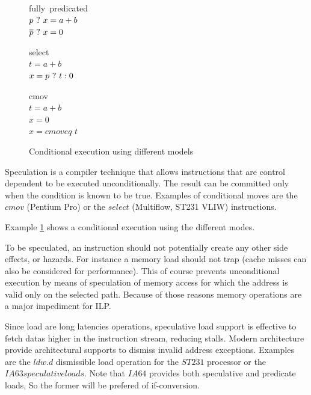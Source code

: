 \begin{figure}
\footnotesize
\begin{minipage}[t]{3cm}
\mbox{fully predicated} \\
$p ~?~ x = a + b $ \\
$\overline{p} ~?~ x = 0 $ \\
\end{minipage} 
\begin{minipage}[t]{3cm}
\mbox{select} \\
$t = a + b $ \\
$x= p ~?~ t : 0 $ \\
\end{minipage}
\begin{minipage}[t]{3cm}
\mbox{cmov} \\
$t = a + b $ \\
$x = 0 $ \\
$x = cmoveq$ $t$ \\
\end{minipage}
\caption{Conditional execution using different models}
\label{fig:pred}
\end{figure}

Speculation is a compiler technique that allows instructions that are control dependent to be executed unconditionally. The result can be committed only when the condition is known to be true. Examples of conditional moves are the $cmov$ (Pentium Pro) or the $select$ (Multiflow, ST231 VLIW) instructions.

Example \ref{fig:pred} shows a conditional execution using the different modes.

To be speculated, an instruction should not potentially create any other side effects, or hazards. For instance a memory load should not trap (cache misses can also be considered for performance). This of course prevents unconditional execution by means of speculation of memory access for which the address is valid only on the selected path. Because of those reasons memory operations are a major impediment for ILP. 

Since load are long latencies operations, speculative load support is effective to fetch datas higher in the instruction stream, reducing stalls. Modern architecture provide architectural supports to dismiss invalid address exceptions. Examples are the $ldw.d$ dismissible load operation for the $ST231$ processor or the $IA63 speculative loads$. Note that $IA64$ provides both speculative and predicate loads, So the former will be prefered of if-conversion. 

